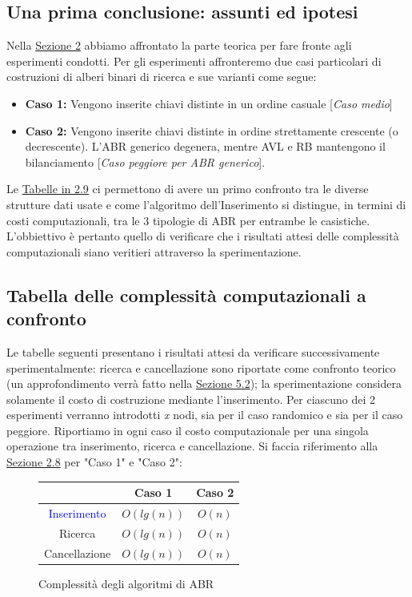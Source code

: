 \subsection{Una prima conclusione: assunti ed ipotesi}
\label{Sezione2.8}
Nella \hyperref[sezione2]{Sezione 2} abbiamo affrontato la parte teorica per fare fronte agli esperimenti condotti. Per gli esperimenti affronteremo due casi particolari di costruzioni di alberi binari di ricerca e sue varianti come segue:
\begin{itemize}
	\item \textbf{Caso 1:}  Vengono inserite chiavi distinte in un ordine
	casuale [\textit{Caso medio}]
	\item \textbf{Caso 2:} Vengono inserite chiavi distinte in ordine
	strettamente crescente (o decrescente). L'ABR generico degenera,
	mentre AVL e RB mantengono il bilanciamento [\textit{Caso peggiore per ABR generico}].
\end{itemize}
Le \hyperref[Tabelle2.9]{Tabelle in 2.9} ci permettono di avere un primo confronto tra le diverse strutture dati usate e come l'algoritmo dell'Inserimento si distingue, in termini di costi computazionali, tra le 3 tipologie di ABR per entrambe le casistiche. L'obbiettivo è pertanto quello di verificare che i risultati attesi delle complessità computazionali siano veritieri attraverso la sperimentazione.
\subsection{Tabella delle complessità computazionali a confronto}
Le tabelle seguenti presentano i risultati attesi da verificare successivamente sperimentalmente: ricerca e cancellazione sono riportate come confronto teorico (un approfondimento verrà fatto nella \hyperref[Sezione5.2]{Sezione 5.2}); la sperimentazione considera solamente il costo di costruzione mediante l'inserimento. Per ciascuno dei 2 esperimenti verranno introdotti \textit{x} nodi, sia per il caso randomico e sia per il caso peggiore. Riportiamo in ogni caso il costo computazionale per una singola operazione tra inserimento, ricerca e cancellazione. Si faccia riferimento alla \hyperref[Sezione2.8]{Sezione 2.8} per "Caso 1" e "Caso 2":
\label{Tabelle2.9}
\begin{figure}[H]
	\centering
	\begin{tabular}{|c|c|c|}
		\hline
		& Caso 1 & Caso 2\\
		\hline
		\textcolor{blue}{Inserimento} & $O(lg(n))$ & $O(n)$\\
		\hline
		Ricerca & $O(lg(n))$ & $O(n)$\\
		\hline
		Cancellazione & $O(lg(n))$ & $O(n)$\\
		\hline
	\end{tabular}
	\caption{Complessità degli algoritmi di ABR}
	\label{fig:ComplessitàABR}
\end{figure}


